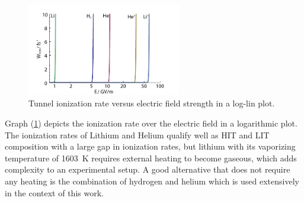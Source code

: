 \begin{figure}[ht]
\centering
\includegraphics[width=0.6\textwidth]{theory/images/edited/Ionization_gap.pdf}
\caption{Tunnel ionization rate versus electric field strength in a log-lin plot. }
\label{img:Ionization_gap}
\end{figure}
Graph (\ref{img:Ionization_gap}) depicts the ionization rate over the electric field in a logarithmic plot. The ionization rates of Lithium and Helium qualify well as HIT and LIT composition with a large gap in ionization rates, but lithium with its vaporizing temperature of 1603\ K \cite{zhang2011boilingTemp} requires external heating to become gaseous, which adds complexity to an experimental setup. A good alternative that does not require any heating is the combination of hydrogen and helium which is used extensively in the context of this work.


